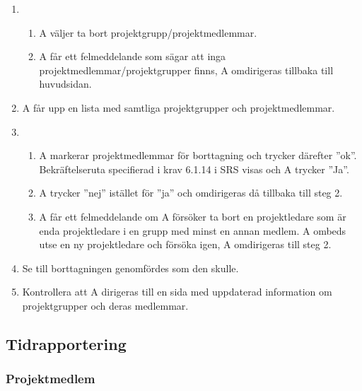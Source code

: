\documentclass[a4paper]{article}
\begin{document}
\begin{ST}
\begin{enumerate}
\item 
\begin{enumerate}
\item A väljer ta bort projektgrupp/projektmedlemmar.
\item A får ett felmeddelande som sägar att inga projektmedlemmar/projektgrupper finns, A omdirigeras tillbaka till huvudsidan.
\end{enumerate}
\item A får upp en lista med samtliga projektgrupper och projektmedlemmar.
\item 
\begin{enumerate}
\item A markerar projektmedlemmar för borttagning och trycker därefter ''ok''. Bekräftelseruta specifierad i krav 6.1.14 i SRS visas och A trycker ''Ja''.
\item A trycker ''nej'' istället för ''ja'' och omdirigeras då tillbaka till steg 2.
\item A får ett felmeddelande om A försöker ta bort en projektledare som är enda projektledare i en grupp med minst en annan medlem. A ombeds utse en ny projektledare och försöka igen, A omdirigeras till steg 2.
\end{enumerate}
\item Se till borttagningen genomfördes som den skulle.
\item Kontrollera att A dirigeras till en sida med uppdaterad information om projektgrupper och deras medlemmar.
\end{enumerate}

\end{ST}




\subsection{Tidrapportering}
\subsubsection{Projektmedlem}
\end{document}
